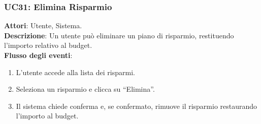 \subsubsection{UC31: Elimina Risparmio}
\textbf{Attori}: Utente, Sistema. \\
\textbf{Descrizione}: Un utente può eliminare un piano di risparmio, restituendo l’importo relativo al budget. \\
\textbf{Flusso degli eventi}:
\begin{enumerate}
    \item L’utente accede alla lista dei risparmi.
    \item Seleziona un risparmio e clicca su ``Elimina''.
    \item Il sistema chiede conferma e, se confermato, rimuove il risparmio restaurando l’importo al budget.
\end{enumerate}
